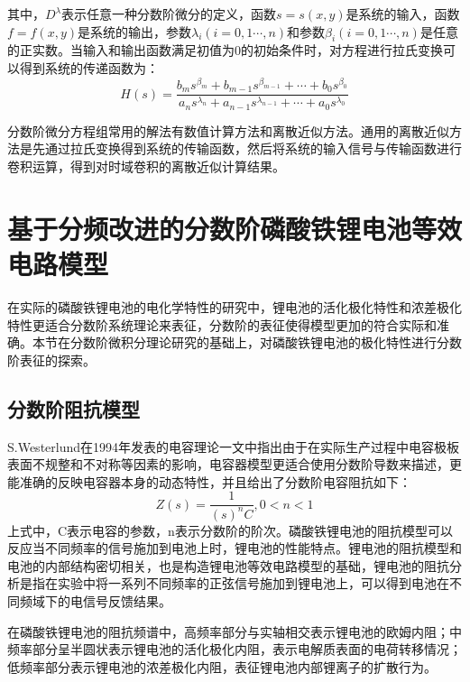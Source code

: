 其中，${{D}^{\lambda }}$表示任意一种分数阶微分的定义，函数$s=s\left( x,y \right)$是系统的输入，函数$f=f\left( x,y \right)$是系统的输出，参数${{\lambda }_{i}}\left( i=0,1\cdots ,n \right)$和参数${{\beta }_{i}}\left( i=0,1\cdots ,n \right)$是任意的正实数。当输入和输出函数满足初值为0的初始条件时，对方程进行拉氏变换可以得到系统的传递函数为：
\begin{equation}
H\left( s \right)=\frac{{{b}_{m}}{{s}^{{{\beta }_{m}}}}+{{b}_{m-1}}{{s}^{{{\beta }_{m-1}}}}+\cdots +{{b}_{0}}{{s}^{{{\beta }_{0}}}}}{{{a}_{n}}{{s}^{{{\lambda }_{n}}}}+{{a}_{n-1}}{{s}^{{{\lambda }_{n-1}}}}+\cdots +{{a}_{0}}{{s}^{{{\lambda }_{0}}}}}
\end{equation}

分数阶微分方程组常用的解法有数值计算方法和离散近似方法。通用的离散近似方法是先通过拉氏变换得到系统的传输函数，然后将系统的输入信号与传输函数进行卷积运算，得到对时域卷积的离散近似计算结果。
\section{基于分频改进的分数阶磷酸铁锂电池等效电路模型}
在实际的磷酸铁锂电池的电化学特性的研究中，锂电池的活化极化特性和浓差极化特性更适合分数阶系统理论来表征，分数阶的表征使得模型更加的符合实际和准确。本节在分数阶微积分理论研究的基础上，对磷酸铁锂电池的极化特性进行分数阶表征的探索。
\subsection{分数阶阻抗模型}
S.Westerlund在1994年发表的电容理论一文中指出由于在实际生产过程中电容极板表面不规整和不对称等因素的影响，电容器模型更适合使用分数阶导数来描述，更能准确的反映电容器本身的动态特性，并且给出了分数阶电容阻抗如下：
\begin{equation}
Z\left( s \right)=\frac{1}{{{\left( s \right)}^{n}}C},0<n<1
\end{equation}
上式中，C表示电容的参数，n表示分数阶的阶次。磷酸铁锂电池的阻抗模型可以反应当不同频率的信号施加到电池上时，锂电池的性能特点。锂电池的阻抗模型和电池的内部结构密切相关，也是构造锂电池等效电路模型的基础，锂电池的阻抗分析是指在实验中将一系列不同频率的正弦信号施加到锂电池上，可以得到电池在不同频域下的电信号反馈结果。

在磷酸铁锂电池的阻抗频谱中，高频率部分与实轴相交表示锂电池的欧姆内阻；中频率部分呈半圆状表示锂电池的活化极化内阻，表示电解质表面的电荷转移情况；低频率部分表示锂电池的浓差极化内阻，表征锂电池内部锂离子的扩散行为。
